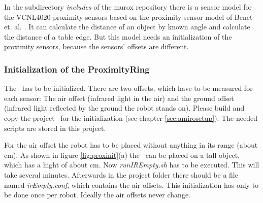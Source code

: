 In the subdirectory {\it includes} of the murox repository there is a sensor model for the VCNL4020 proximity sensors based on the proximity sensor model of Benet et. al. \cite{Benet_etal}. It can calculate the distance of an object by known angle and calculate the distance of a table edge. But this model needs an initialization of the proximity sensors, because the sensors' offsets are different.

\subsubsection{Initialization of the ProximityRing}

The \proxring\ has to be initialized. There are two offsets, which have to be measured for each sensor: The air offset (infrared light in the air) and the ground offset (infrared light reflected by the ground the robot stands on). Please build and copy the project \demopathI\initialnameI\ for the initialization (see chapter \ref{sec:amirosetup}). The needed scripts are stored in this project.

For the air offset the robot has to be placed without anything in its range (about \unit[25]{cm}). As shown in figure \ref{fig:proxinit}(a) the \amiro\ can be placed on a tall object, which has a hight of about \unit[25]{cm}. Now {\it runIREmpty.sh} has to be executed. This will take several minutes. Afterwards in the project folder there should be a file named {\it irEmpty.conf}, which contains the air offsets. This initialization has only to be done once per robot. Ideally the air offsets never change.

